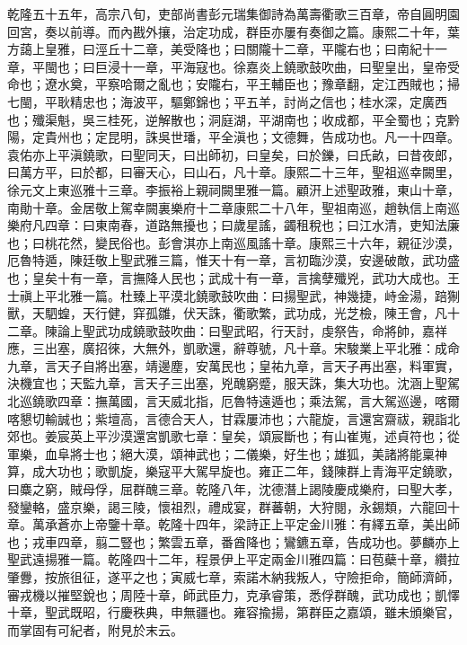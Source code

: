 \begin{pinyinscope}
乾隆五十五年，高宗八旬，吏部尚書彭元瑞集御詩為萬壽衢歌三百章，帝自圓明園回宮，奏以前導。而內戡外攘，治定功成，群臣亦屢有奏御之篇。康熙二十年，葉方藹上皇雅，曰涇丘十二章，美受降也；曰關隴十二章，平隴右也；曰南紀十一章，平閩也；曰巨浸十一章，平海寇也。徐嘉炎上鐃歌鼓吹曲，曰聖皇出，皇帝受命也；遼水奠，平察哈爾之亂也；安隴右，平王輔臣也；豫章翻，定江西賊也；掃七閩，平耿精忠也；海波平，驅鄭錦也；平五羊，討尚之信也；桂水深，定廣西也；殲渠魁，吳三桂死，逆解散也；洞庭湖，平湖南也；收成都，平全蜀也；克黔陽，定貴州也；定昆明，誅吳世璠，平全滇也；文德舞，告成功也。凡一十四章。袁佑亦上平滇鐃歌，曰聖同天，曰出師初，曰皇矣，曰於鑠，曰氏畝，曰昔夜郎，曰萬方平，曰於都，曰審天心，曰山石，凡十章。康熙二十三年，聖祖巡幸闕里，徐元文上東巡雅十三章。李振裕上親祠闕里雅一篇。顧汧上述聖政雅，東山十章，南勛十章。金居敬上駕幸闕裏樂府十二章康熙二十八年，聖祖南巡，趙執信上南巡樂府凡四章：曰東南春，道路無擾也；曰歲星謠，蠲租稅也；曰江水清，吏知法廉也；曰桃花然，變民俗也。彭會淇亦上南巡風謠十章。康熙三十六年，親征沙漠，厄魯特遁，陳廷敬上聖武雅三篇，惟天十有一章，言初臨沙漠，安邊破敵，武功盛也；皇矣十有一章，言撫降人民也；武成十有一章，言擒孽殲兇，武功大成也。王士禛上平北雅一篇。杜臻上平漠北鐃歌鼓吹曲：曰揚聖武，神幾捷，峙金湯，踣猘獸，天駟蝗，天行健，穽孤雛，伏天誅，衢歌繁，武功成，光芝檢，陳王會，凡十二章。陳論上聖武功成鐃歌鼓吹曲：曰聖武昭，行天討，虔祭告，命將帥，嘉祥應，三出塞，廣招徠，大無外，凱歌還，辭尊號，凡十章。宋駿業上平北雅：成命九章，言天子自將出塞，靖邊塵，安萬民也；皇祐九章，言天子再出塞，料軍實，決機宜也；天監九章，言天子三出塞，兇醜窮蹙，服天誅，集大功也。沈涵上聖駕北巡鐃歌四章：撫萬國，言天威北指，厄魯特遠遁也；乘法駕，言大駕巡邊，喀爾喀懇切輸誠也；紫壇高，言德合天人，甘霖屢沛也；六龍旋，言還宮齋祓，親詣北郊也。姜宸英上平沙漠還宮凱歌七章：皇矣，頌宸斷也；有山崔嵬，述貞符也；從軍樂，血阜將士也；絕大漠，頌神武也；二儀樂，好生也；雄狐，美諸將能稟神算，成大功也；歌凱旋，樂寇平大駕早旋也。雍正二年，錢陳群上青海平定鐃歌，曰麋之窮，賊母俘，屈群醜三章。乾隆八年，沈德潛上謁陵慶成樂府，曰聖大孝，發鑾輅，盛京樂，謁三陵，懷祖烈，禮成宴，群蕃朝，大狩閱，永錫類，六龍回十章。萬承蒼亦上帝鑒十章。乾隆十四年，梁詩正上平定金川雅：有繹五章，美出師也；戎車四章，翦二豎也；繁雲五章，番酋降也；鸞鑣五章，告成功也。夢麟亦上聖武遠揚雅一篇。乾隆四十二年，程景伊上平定兩金川雅四篇：曰苞蘗十章，纘拉肇釁，按旅徂征，遂平之也；寅威七章，索諾木納我叛人，守險拒命，簡師濟師，審戎機以摧堅銳也；周陸十章，師武臣力，克承睿策，悉俘群醜，武功成也；凱懌十章，聖武既昭，行慶秩典，申無疆也。雍容揄揚，第群臣之嘉頌，雖未頒樂官，而掌固有可紀者，附見於末云。


\end{pinyinscope}